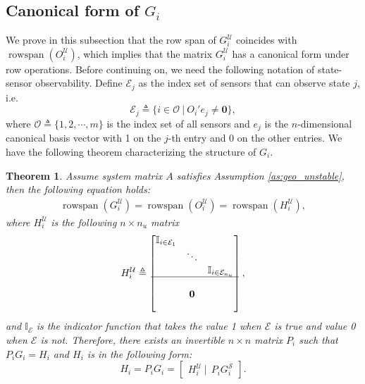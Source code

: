 \documentclass[12pt]{article}  %
\newcommand{\Ib}{{\mathbb{I}}}
\newcommand{\Es}{{\mathscr{E}}}
\newcommand{\Ec}{{\mathcal{E}}} %
\newcommand{\Uc}{{\mathcal{U}}}
\newcommand{\Sc}{{\mathcal{S}}}
\newcommand{\Oc}{{\mathcal{O}}}
\DeclareMathOperator{\rs}{{rowspan}}
\newtheorem{theorem}{\textbf{Theorem}}
\begin{document}
\subsection{Canonical form of $G_i$}\label{subsec:transform}
We prove in this subsection that the row span of $G^\Uc_i$ coincides with $\rs(O^\Uc_{i})$, which implies that the matrix $G^\Uc_i$ has a canonical form under row operations. 
Before continuing on, we need the following notation of state-sensor observability. 
Define $\Ec_j$ as the index set of sensors that can observe state $j$, i.e.
\begin{equation}\label{eq:def_Ec}
\Ec_j\triangleq \{i\in\Oc\ |\ O_i{'} e_j\neq \mathbf{0} \},
\end{equation}
where $\Oc\triangleq \{1,2,\cdots,m\}$ is the index set of all sensors and $e_j$ is the $n$-dimensional canonical basis vector with 1 on the $j$-th entry and 0 on the other entries.
We have the following theorem characterizing the structure of $G_i$. 
\begin{theorem}\label{th:span}
	Assume system matrix $A$ satisfies Assumption \ref{as:geo_unstable}, then the following equation holds:
	\begin{align}\label{eq:span}
	\rs(G_i^\Uc)=\rs(O_i^\Uc)=\rs(H_i^\Uc) ,
	\end{align}
	where $H^\Uc_i$ is the following $n\times n_u$ matrix
	\begin{equation*}
	H_i^\Uc\triangleq \begin{bmatrix}
	\Ib_{i\in\Ec_1} & & \\
	& \ddots&   \\
	& & \Ib_{i\in\Ec_{n_u}}\\
	\hline \\
	& \mathbf{0} &\\
	& &
	\end{bmatrix} ,
	\end{equation*}
	and $\mathbb{I}_\Es$ is the indicator function that takes the value 1 when $\Es$ is true and value 0 when $\Es$ is not.
	Therefore, there exists an invertible $n\times n$ matrix $P_i$ such that $P_iG_i=H_i$ and $H_i$ is in the following form:
	\begin{equation*}
	H_i=P_iG_i=\left[\begin{array}{c} H_i^\Uc \ | \ \ P_i G^\Sc_i\end{array}\right] .
	\end{equation*}
\end{theorem}
\end{document}
